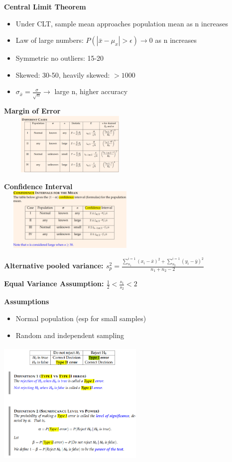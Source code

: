 \documentclass[10pt, landscape]{article}
\begin{document}
\begin{multicols}{4}
\textbf{Central Limit Theorem} \newline
\begin{itemize}
  \item Under CLT, sample mean approaches population mean as n increases
  \item Law of large numbers: $P(|\bar{x}-\mu_x|>\epsilon) \rightarrow 0$ as n increases
  \item Symmetric no outliers: 15-20
  \item Skewed: 30-50, heavily skewed: $>1000$
  \item $\sigma_{\bar{x}} = \frac{\sigma}{\sqrt{n}} \rightarrow$ large n, higher accuracy 
\end{itemize}




\textbf{Margin of Error}\\
\includegraphics[width=7cm, height=3cm]{moe.png}

\textbf{Confidence Interval}\\
\includegraphics[width=7cm, height=3cm]{ci.png}

\textbf{Alternative pooled variance: $s^2_p = \frac{\sum_{n_1}^{i=1}(x_i-\bar{x})^2 + \sum_{n_2}^{i=1}(y_i-\bar{y})^2}{n_1+n_2-2}$}



\textbf{Equal Variance Assumption: $\frac{1}{2} < \frac{s_1}{s_2} < 2$}

\textbf{Assumptions} \\
\begin{itemize}
  \item Normal population (esp for small samples)
  \item Random and independent sampling
\end{itemize}

\includegraphics[width=7cm, height=6cm]{errors.png}


\end{multicols}
\end{document}
